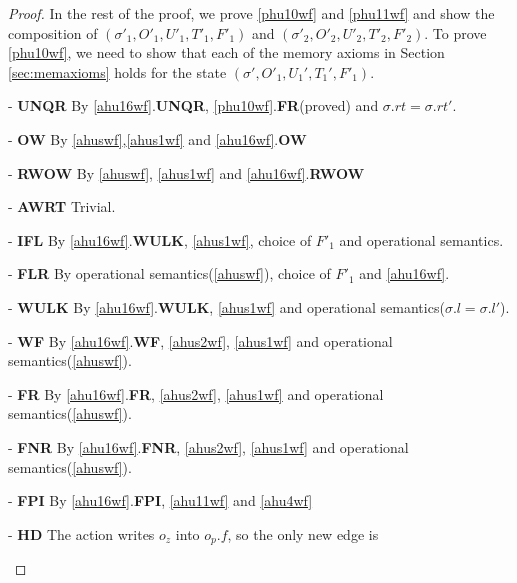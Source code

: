 \begin{proof}
In the rest of the proof, we prove \ref{phu10wf} and \ref{phu11wf} and show the composition of $(\sigma'_1, O'_1, U'_1,T'_1,F'_1)$ and  $(\sigma'_2, O'_2, U'_2,T'_2,F'_2)$. To prove \ref{phu10wf}, we need to show that each of the memory axioms in Section \ref{sec:memaxioms} holds for the state $(\sigma',O'_1,U_1',T_1',F'_1)$.
\begin{case} - \textbf{UNQR} By \ref{ahu16wf}.\textbf{UNQR}, \ref{phu10wf}.\textbf{FR}(proved) and $\sigma.rt = \sigma.rt'$.
\end{case}
\begin{case} - \textbf{OW} By \ref{ahuswf},\ref{ahus1wf} and \ref{ahu16wf}.\textbf{OW}
\end{case}
\begin{case} - \textbf{RWOW} By \ref{ahuswf}, \ref{ahus1wf} and \ref{ahu16wf}.\textbf{RWOW}
\end{case}
\begin{case} - \textbf{AWRT} Trivial. 
\end{case}
\begin{case} - \textbf{IFL}  By \ref{ahu16wf}.\textbf{WULK}, \ref{ahus1wf}, choice of $F'_1$ and operational semantics.
\end{case}
\begin{case} - \textbf{FLR}  By operational semantics(\ref{ahuswf}), choice of $F'_1$ and \ref{ahu16wf}. 
\end{case}
\begin{case} - \textbf{WULK}  By \ref{ahu16wf}.\textbf{WULK}, \ref{ahus1wf} and operational semantics($\sigma.l = \sigma.l'$).
\end{case}
\begin{case} - \textbf{WF} By \ref{ahu16wf}.\textbf{WF}, \ref{ahus2wf}, \ref{ahus1wf} and operational semantics(\ref{ahuswf}).
\end{case}
\begin{case} - \textbf{FR} By \ref{ahu16wf}.\textbf{FR}, \ref{ahus2wf}, \ref{ahus1wf} and operational semantics(\ref{ahuswf}).
\end{case}
\begin{case} - \textbf{FNR} By \ref{ahu16wf}.\textbf{FNR}, \ref{ahus2wf}, \ref{ahus1wf} and operational semantics(\ref{ahuswf}).
\end{case}
\begin{case} - \textbf{FPI} By \ref{ahu16wf}.\textbf{FPI}, \ref{ahu11wf} and \ref{ahu4wf}
\end{case} 
\begin{case} - \textbf{HD}
The action writes $o_z$ into $o_p.f$, so the only new edge is

\end{case}
\end{proof}
